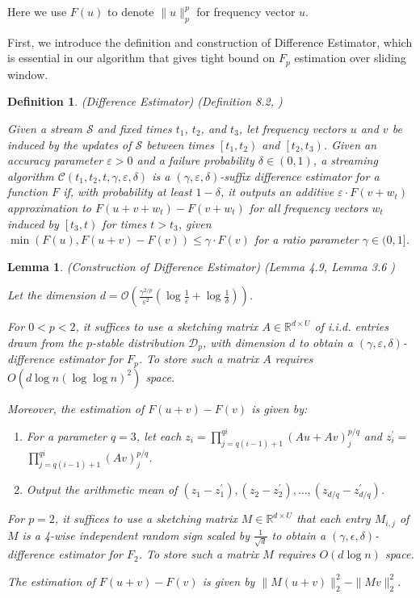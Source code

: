 \documentclass{article}
\newcommand{\diff}{\textsf{Difference Estimator}}
\theoremstyle{plain}
\newtheorem{lem}[theorem]{Lemma}
\newtheorem{defn}[theorem]{Definition}
\begin{document}
Here we use $F(u)$ to denote $\|u\|_p ^ p$ for frequency vector $u$. 

First, we introduce the definition and construction of \diff, which is essential in our algorithm that gives tight bound on $F_p$ estimation over sliding window. 

\begin{defn}\label{dif} (Difference Estimator) (Definition 8.2, \cite{woodruff2022tight})

Given a stream $\mathcal{S}$ and fixed times $t_1$, $t_2$, and $t_3$, let frequency vectors $u$ and $v$ be induced by the updates of $\mathcal{S}$ between times $\left[t_1, t_2\right)$ and $\left[t_2, t_3\right)$. Given an accuracy parameter $\varepsilon>0$ and a failure probability $\delta \in(0,1)$, a streaming algorithm $\mathcal{C}\left(t_1, t_2, t, \gamma, \varepsilon, \delta\right)$ is a $(\gamma, \varepsilon, \delta)$-suffix difference estimator for a function $F$ if, with probability at least $1-\delta$, it outputs an additive $\varepsilon \cdot F\left(v+w_t\right)$ approximation to $F\left(u+v+w_t\right)-F\left(v+w_t\right)$ for all frequency vectors $w_t$ induced by $\left[t_3, t\right)$ for times $t>t_3$, given $\min (F(u), F(u+v)-F(v)) \leq \gamma \cdot F(v)$ for a ratio parameter $\gamma \in(0,1]$.
    
\end{defn}

\begin{lem}\label{dif lemma} (Construction of Difference Estimator) (Lemma 4.9, Lemma 3.6 \cite{woodruff2022tight})


Let the dimension $d = \mathcal{O}\left(\frac{\gamma^{2 / p}}{\varepsilon^2}\left(\log \frac{1}{\varepsilon}+\log \frac{1}{\delta}\right)\right)$.

For $0<p<2$, it suffices to use a sketching matrix $A \in \mathbb{R}^{d \times U}$ of i.i.d. entries drawn from the $p$-stable distribution $\mathcal{D}_p$, with dimension $d$ to obtain a $(\gamma, \varepsilon, \delta)$-difference estimator for $F_p$. To store such a matrix $A$ requires $O(d\log n(\log \log n) ^ 2)$  space. 

Moreover, the estimation of $F(u + v)- F(v)$ is given by: 
\begin{enumerate}
    \item For a parameter $q=3$, let each $z_i=\prod_{j=q(i-1)+1}^{q i}\left(A u+A v\right)_j^{p / q}$ and $z_i^{\prime}=$ $\prod_{j=q(i-1)+1}^{q i}(A v)_j^{p / q}$.
    \item Output the arithmetic mean of $\left(z_1-z_1^{\prime}\right),\left(z_2-z_2^{\prime}\right), \ldots,\left(z_{d / q}-z_{d / q}^{\prime}\right)$.
\end{enumerate}

For $p = 2$, it suffices to use a sketching matrix $M \in \mathbb{R} ^ {d\times U}$ that each entry $M_{i,j}$ of $M$ is a 4-wise independent random sign scaled by $\frac 1{\sqrt d}$ to obtain a $(\gamma, \epsilon, \delta)$-difference estimator for $F_2$. To store such a matrix $M$ requires $O(d \log n)$ space.

The estimation of $F(u+v) - F(v)$ is given by $\|M(u+v)\|_2 ^ 2 -\|Mv\|_2^2$.
    
\end{lem}
\end{document}

